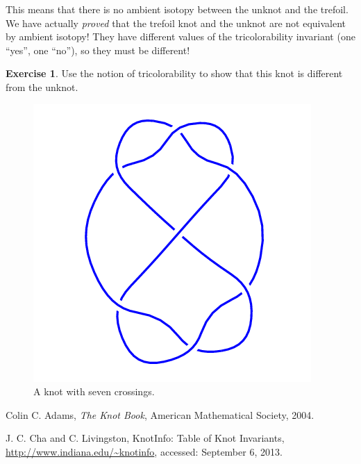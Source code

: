 \documentclass[12pt,letterpaper]{article}
\theoremstyle{definition}
\newtheorem{exercise}[question]{Exercise}
\begin{document}
This means that there is no ambient isotopy between the unknot and the trefoil.
We have actually \emph{proved} that the trefoil knot and the unknot are not equivalent by ambient isotopy! They have different values of the tricolorability invariant (one ``yes'', one ``no''), so they must be different!


\begin{exercise}
Use the notion of tricolorability to show that this knot is different from the unknot.
\end{exercise}

\begin{figure}[h]
    \centering
    \includegraphics[width=.5\textwidth]{rgp08pics/7_4.png}
    \caption{A knot with seven crossings.}
\end{figure}

\begin{thebibliography}{9}

	Colin C. Adams,
	\emph{The Knot Book},
	American Mathematical Society,
	2004.

	J. C. Cha and C. Livingston,
	KnotInfo: Table of Knot Invariants,
	\url{http://www.indiana.edu/~knotinfo},
	accessed: September 6, 2013.


\end{thebibliography}
\end{document}
